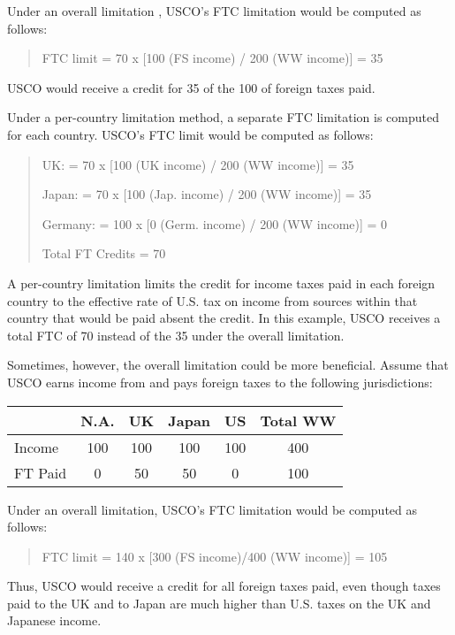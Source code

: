 Under an overall limitation , USCO's FTC limitation would be computed as follows: 
\begin{quotation}

FTC limit = 70 x [100 (FS income) / 200 (WW income)] = 35
\end{quotation} 
USCO would receive a credit for 35 of the 100 of foreign taxes paid.  

Under a per-country limitation method, a separate FTC limitation is computed for each country. 
USCO's FTC limit would be computed as follows: 
\begin{quotation}
UK: = 70 x [100 (UK income) / 200 (WW income)] = 35

Japan: = 70 x [100 (Jap. income) / 200 (WW income)]  = 35
 
Germany: = 100 x [0 (Germ. income) / 200 (WW income)] = 0
 
Total FT Credits =  70 
\end{quotation}
A per-country limitation limits the credit for income taxes paid in each foreign country to the 
effective rate of U.S. tax on income from sources within that country that would be paid absent the 
credit.  In this example, USCO receives a total FTC of 70 instead of the 35 under the overall limitation. 

Sometimes, however,  the overall limitation could be more beneficial.  Assume that USCO earns income 
from and pays foreign taxes to the following jurisdictions: 
\begin{center}
 
  \begin{tabular}{l c c c c c}         
  & N.A. & UK & Japan & US & Total WW\\
  \hline
  Income & 100 & 100 & 100 & 100 & 400 \\
  FT Paid & 0 & 50 & 50 & 0 & 100 \\
  \hline
    \end{tabular}
   \end{center}
Under an overall limitation, USCO's FTC limitation would be computed as follows: 

\begin{quotation} FTC limit = 140 x [300 (FS income)/400 (WW income)] = 105 
\end{quotation}
Thus, USCO would receive a credit for all foreign taxes paid, even though taxes paid to the UK and to Japan are 
much higher than U.S. taxes on the UK and Japanese income.

